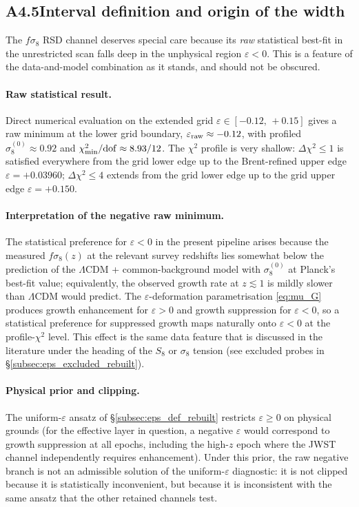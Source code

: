 \subsection*{A4.5\quad Interval definition and origin of the width}

The $f\sigma_8$ RSD channel deserves special care because its
\emph{raw} statistical best-fit in the unrestricted scan falls
deep in the unphysical region $\varepsilon < 0$. This is a
feature of the data-and-model combination as it stands, and
should not be obscured.

\paragraph{Raw statistical result.}
Direct numerical evaluation on the extended grid
$\varepsilon \in [-0.12,\,+0.15]$ gives a raw minimum at the lower
grid boundary, $\varepsilon_{\rm raw} \approx -0.12$, with
profiled $\sigma_8^{(0)} \approx 0.92$ and
$\chi^2_{\min}/{\rm dof} \approx 8.93/12$. The $\chi^2$ profile is
very shallow: $\Delta\chi^2 \leq 1$ is satisfied everywhere from
the grid lower edge up to the Brent-refined upper edge
$\varepsilon = +0.03960$; $\Delta\chi^2 \leq 4$ extends from the
grid lower edge up to the grid upper edge
$\varepsilon = +0.150$.

\paragraph{Interpretation of the negative raw minimum.}
The statistical preference for $\varepsilon < 0$ in the present
pipeline arises because the measured $f\sigma_8(z)$ at the
relevant survey redshifts lies somewhat below the prediction of
the $\Lambda$CDM + common-background model with
$\sigma_8^{(0)}$ at Planck's best-fit value; equivalently, the
observed growth rate at $z \lesssim 1$ is mildly slower than
$\Lambda$CDM would predict. The $\varepsilon$-deformation
parametrisation \eqref{eq:mu_G} produces growth enhancement for
$\varepsilon > 0$ and growth suppression for $\varepsilon < 0$,
so a statistical preference for suppressed growth maps naturally
onto $\varepsilon < 0$ at the profile-$\chi^2$ level. This effect
is the same data feature that is discussed in the literature
under the heading of the $S_8$ or $\sigma_8$ tension (see
excluded probes in \S\ref{subsec:eps_excluded_rebuilt}).

\paragraph{Physical prior and clipping.}
The uniform-$\varepsilon$ ansatz of
\S\ref{subsec:eps_def_rebuilt} restricts $\varepsilon \geq 0$
on physical grounds (for the effective layer in question, a
negative $\varepsilon$ would correspond to growth suppression at
all epochs, including the high-$z$ epoch where the JWST channel
independently requires enhancement). Under this prior, the raw
negative branch is not an admissible solution of the
uniform-$\varepsilon$ diagnostic: it is not clipped because it is
statistically inconvenient, but because it is inconsistent with
the same ansatz that the other retained channels test.

